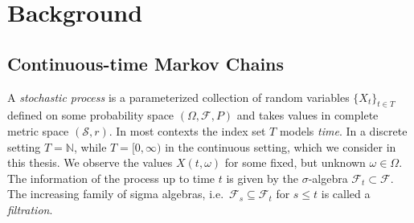 \chapter{Background}\label{ch:background}

\section{Continuous-time Markov Chains}
A \emph{stochastic process} is a parameterized collection of random variables $\{X_t\}_{t\in T}$ defined on some probability space $(\Omega, \mathcal{F}, P)$ and takes values in complete metric space $(\mathcal{S}, r)$.
In most contexts the index set $T$ models \emph{time}.
In a discrete setting $T=\mathbb{N}$, while $T=[0,\infty)$ in the continuous setting, which we consider in this thesis.
We observe the values $X(t, \omega)$ for some fixed, but unknown $\omega\in\Omega$.
The information of the process up to time $t$ is given by the $\sigma$-algebra $\mathcal{F}_t\subset\mathcal{F}$.
The increasing family of sigma algebras, i.e.\ $\mathcal{F}_s\subseteq\mathcal{F}_t$ for $s\leq t$ is called a \emph{filtration}.

